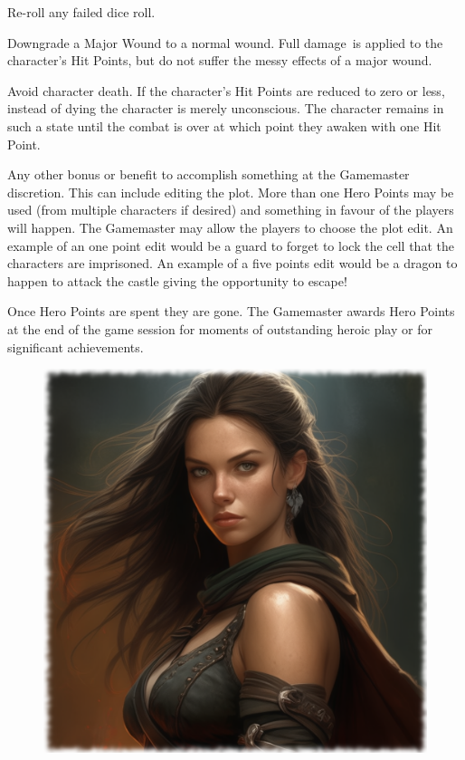 \begin{rpg-list}
	\item Re-roll any failed dice roll.
	\item Downgrade a Major Wound to a normal wound. Full damage is applied to the character's Hit Points, but do not suffer the messy effects of a major wound.
	\item Avoid character death. If the character’s Hit Points are reduced to zero or less, instead of dying the character is merely unconscious. The character remains in such a state until the combat is over at which point they awaken with one Hit Point.
	\item Any other bonus or benefit to accomplish something at the Gamemaster discretion. This can include editing the plot. More than one Hero Points may be used (from multiple characters if desired) and something in favour of the players will happen. The Gamemaster may allow the players to choose the plot edit. An example of an one point edit would be a guard to forget to lock the cell that the characters are imprisoned. An example of a five points edit would be a dragon to happen to attack the castle giving the opportunity to escape!
\end{rpg-list}

Once Hero Points are spent they are gone. The Gamemaster awards Hero Points at the end of the game session for moments of outstanding heroic play or for significant achievements.

\begin{figure}%
\begin{center}
\includegraphics[scale=0.24]{img/ai-images/woman-beautiful.png}
\end{center}
\end{figure}

